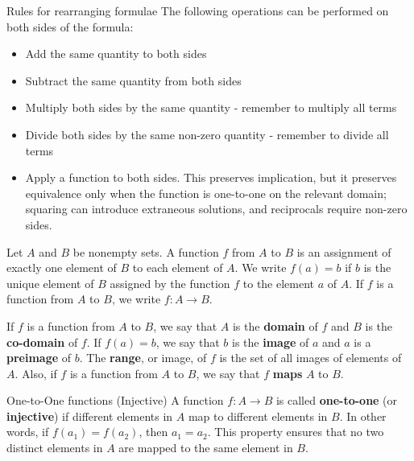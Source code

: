 \begin{custombox}{Rules for rearranging formulae}
The following operations can be performed on both sides of the formula:
\begin{itemize}
    \item Add the same quantity to both sides
    \item Subtract the same quantity from both sides
    \item Multiply both sides by the same quantity - remember to multiply all terms
    \item Divide both sides by the same non-zero quantity - remember to divide all terms
    \item Apply a function to both sides. This preserves implication, but it preserves equivalence only when the function is one-to-one on the relevant domain; squaring can introduce extraneous solutions, and reciprocals require non-zero sides.
\end{itemize}
\end{custombox}

\begin{definition}
Let $A$ and $B$ be nonempty sets. A function $f$ from $A$ to $B$ is an assignment of exactly one element of $B$ to each element of $A$. We write $f(a)=b$ if $b$ is the unique element of $B$ assigned by the function $f$ to the element $a$ of $A$. If $f$ is a function from $A$ to $B$, we write $f: A \rightarrow B$.
\end{definition}

\begin{definition}
If $f$ is a function from $A$ to $B$, we say that $A$ is the \textbf{domain} of $f$ and $B$ is the \textbf{co-domain} of $f$. If $f(a)=b$, we say that $b$ is the \textbf{image} of $a$ and $a$ is a \textbf{preimage} of $b$. The \textbf{range}, or image, of $f$ is the set of all images of elements of $A$. Also, if $f$ is a function from $A$ to $B$, we say that $f$ \textbf{maps} $A$ to $B$.    
\end{definition}

\begin{definition} {One-to-One functions (Injective)}
A function \( f: A \rightarrow B \) is called \textbf{one-to-one} (or \textbf{injective}) if different elements in \( A \) map to different elements in \( B \). In other words, if \( f(a_1) = f(a_2) \), then \( a_1 = a_2 \). This property ensures that no two distinct elements in \( A \) are mapped to the same element in \( B \).     
\end{definition}

